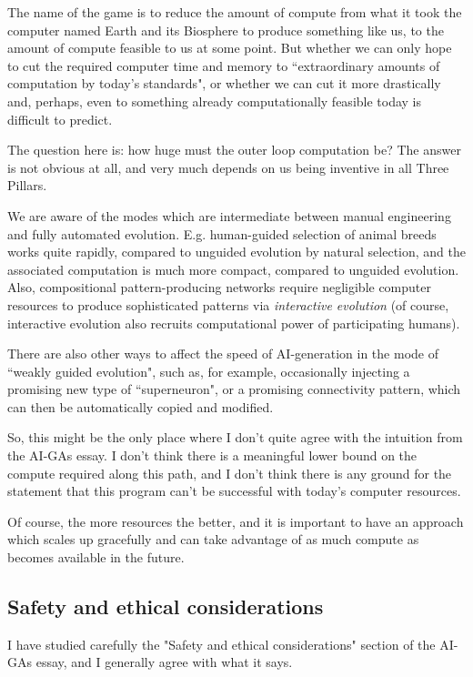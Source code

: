 \documentclass{article}
\begin{document}
The name of the game is to reduce the amount of compute from what it took the computer named Earth and its Biosphere to produce something like us, to the amount of compute feasible to us at some point.
But whether we can only hope to cut the required computer time and memory to ``extraordinary amounts of computation by today’s standards", or whether we can cut it more drastically and, perhaps, 
even to something already computationally feasible today is difficult to predict.

The question here is: how huge must the outer loop computation be? 
The answer is not obvious at all, and very much depends on us being inventive in all Three Pillars.

We are aware of the modes which are intermediate between manual engineering and fully
automated evolution. E.g. human-guided selection of animal breeds works quite rapidly, compared to unguided
evolution by natural selection, and the associated computation is much more compact, compared to unguided
evolution. Also, compositional pattern-producing networks require negligible computer resources to produce
sophisticated patterns via {\em interactive evolution} (of course, interactive evolution also recruits 
computational power of participating humans).

There are also other ways to affect the speed of AI-generation in the mode of ``weakly guided evolution",
such as, for example, occasionally injecting a promising new type of ``superneuron", or a promising
connectivity pattern, which can then be automatically copied and modified.

So, this might be the only place where I don't quite agree with the intuition from the AI-GAs essay.
I don't think there is a meaningful lower bound on the compute required along this path, and
I don't think there is any ground for the statement that this program can't be successful with
today's computer resources. 

Of course, the more resources the better, and it is important
to have an approach which scales up gracefully and can take advantage of as much compute as 
becomes available in the future.

\subsection{Safety and ethical considerations}

I have studied carefully the "Safety and ethical considerations" section of the AI-GAs essay,
and I generally agree with what it says.
\end{document}
